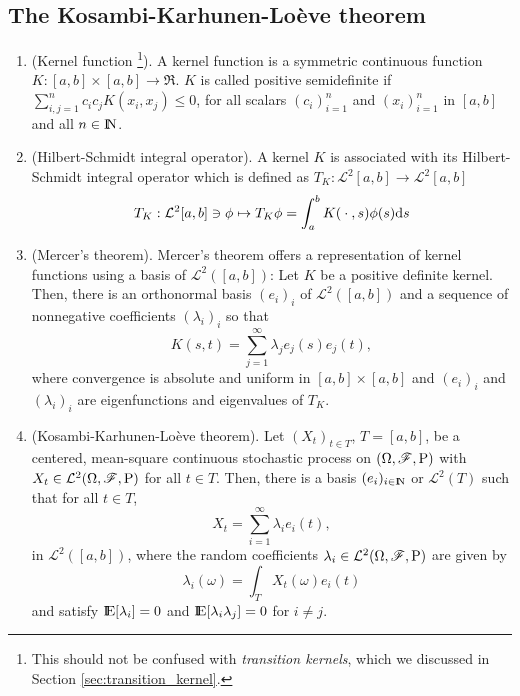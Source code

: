 \documentclass[a4paper,10pt]{article}
\begin{document}
\subsection{The Kosambi-Karhunen-Lo{\`e}ve theorem}
\begin{enumerate}
 \item (Kernel function%
      \footnote{This should not be confused with \textit{transition kernels}, 
                which we discussed in Section \ref{sec:transition_kernel}.}).  
       A kernel function is a symmetric continuous function \(K: [a,b] \times [a,b] \to \Re\).
       \(K\) is called positive semidefinite if \(\sum_{i,j=1}^{n} c_i c_j K(x_i,x_j) \leq 0\),
       for all scalars \((c_i)_{i=1}^{n}\) and \((x_i)_{i=1}^{n}\) in \([a,b]\) and all
       \(n\in\N\).
 \item (Hilbert-Schmidt integral operator). A kernel \(K\) is associated with its
       Hilbert-Schmidt integral operator which is defined as \(T_K: \mathcal{L}^2[a,b]\to\mathcal{L}^2[a,b]\)
       \[
        T_K : \mathcal{L}^2[a,b] \ni \phi \mapsto T_K \phi = \int_{a}^{b}K({}\cdot{},s)\phi(s)\mathrm{d} s
       \]
 \item (Mercer's theorem). Mercer's theorem offers a representation of kernel functions 
       using a basis of \(\mathcal{L}^2([a,b])\): Let \(K\) be a positive definite kernel.
       Then, there is an orthonormal basis \((e_i)_{i}\) of $\mathcal{L}^2([a,b])$ and 
       a sequence of nonnegative coefficients \((\lambda_i)_i\) so that 
       \[
        K(s,t) = \sum_{j=1}^{\infty} \lambda_j e_j(s)e_j(t),
       \]
       where convergence is absolute and uniform in \([a,b]\times [a,b]\) and 
       \((e_i)_i\) and \((\lambda_i)_i\) are eigenfunctions and eigenvalues of \(T_K\).
  
 
 \item (Kosambi-Karhunen-Lo{\`e}ve theorem).  Let \((X_t)_{t\in T}\), \(T=[a,b]\), be a 
       centered, mean-square continuous stochastic process on \((\Omega,\mathscr{F},\mathrm{P})\) with \(X_t\in\mathcal{L}^2(\Omega,\mathscr{F},\mathrm{P})\)
       for all \(t\in T\).
       Then, there is a basis \((e_i)_{i\in\N}\) or \(\mathcal{L}^2(T)\) such that for all 
       \(t\in T\),
       \[
         X_t = \sum_{i=1}^{\infty}\lambda_i e_i(t),
       \]
       in \(\mathcal{L}^2([a,b])\), where the random coefficients \(\lambda_i\in\mathcal{L}^2(\Omega,\mathscr{F},\mathrm{P})\) are given by
       \[
        \lambda_i(\omega) = \int_{T}X_t(\omega)e_i(t)
       \]
       and satisfy \(\E[\lambda_i]=0\) and \(\E[\lambda_i \lambda_j] = 0\) for \(i\neq j\).
       

\end{enumerate}
\end{document}
